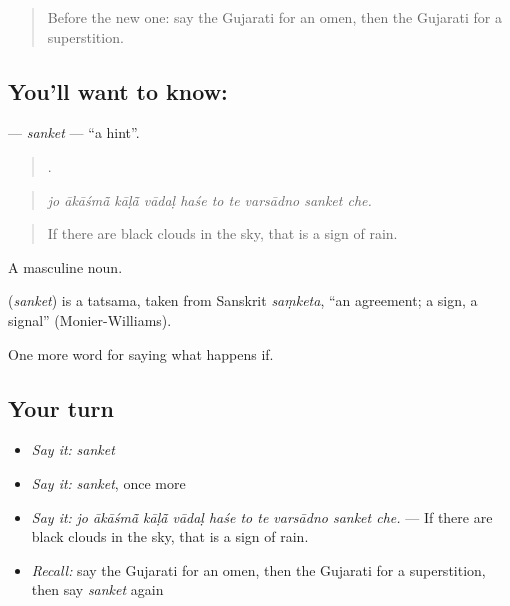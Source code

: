 \label{lesson:GU-C535-sanket}



\begin{quote}
Before the new one: say the Gujarati for an omen, then the Gujarati for a superstition.
\end{quote}

\subsection*{You'll want to know: }
\textbf{} — \emph{sanket} — \textquotedblleft{}a hint\textquotedblright{}.

\begin{quote}
         .
\end{quote}

\begin{quote}
\emph{jo ākāśmā̃ kāḷā̃ vādaḷ haśe to te varsādno sanket che.}
\end{quote}

\begin{quote}
If there are black clouds in the sky, that is a sign of rain.
\end{quote}

A masculine noun.

\begin{cousinweb}
\textbf{} (\emph{sanket}) is a tatsama, taken from Sanskrit \emph{saṃketa}, \textquotedblleft{}an agreement; a sign, a signal\textquotedblright{} (Monier-Williams).
\end{cousinweb}

\begin{grammarlens}[title={What you've built}]
One more word for saying what happens if.
\end{grammarlens}

\subsection*{Your turn}
\begin{itemize}
\raggedright
  \item \emph{Say it:} \emph{sanket}
  \item \emph{Say it:} \emph{sanket}, once more
  \item \emph{Say it:} \emph{jo ākāśmā̃ kāḷā̃ vādaḷ haśe to te varsādno sanket che.} — If there are black clouds in the sky, that is a sign of rain.
  \item \emph{Recall:} say the Gujarati for an omen, then the Gujarati for a superstition, then say \emph{sanket} again
\end{itemize}

